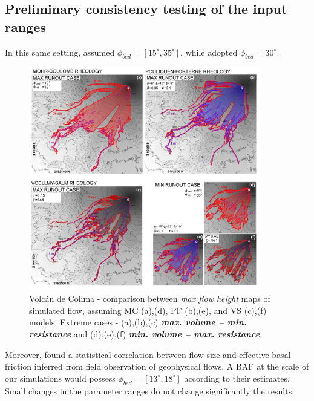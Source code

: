\documentclass{article}
\begin{document}
\subsection{Preliminary consistency testing of the input ranges}
In this same setting, \citep{Dalbey2008} assumed $\phi_{bed}=[15^\mathrm{\circ}, 35^\mathrm{\circ}]$, while \citep{Capra2011} adopted $\phi_{bed}=30^\mathrm{\circ}$.
\begin{figure}[H]
         \centering
        \includegraphics[width=0.90\textwidth]{figures/Colima/ExtremeMaps.jpg}
        \caption{Volc\'an de Colima - comparison between \emph{max flow height} maps of simulated flow, assuming MC (a),(d), PF (b),(e), and VS (c),(f) models. Extreme cases - (a),(b),(c) \emph{\textbf{max. volume -- min. resistance}} and (d),(e),(f) \emph{\textbf{min. volume -- max. resistance}}.}
        \label{Colima-MaxMinExtents}
\end{figure}
Moreover, \citep{Spiller2014,Bayarri2015,Ogburn2016} found a statistical correlation between flow size and effective basal friction inferred from field observation of geophysical flows. A BAF at the scale of our simulations would possess $\phi_{bed}=[13^\mathrm{\circ}, 18^\mathrm{\circ}]$ according to their estimates. Small changes in the parameter ranges do not change significantly the results.
\end{document}
